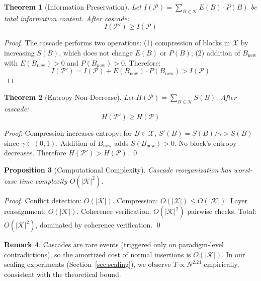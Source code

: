 \documentclass[11pt,a4paper]{article}
\newtheorem{theorem}{Theorem}[section]
\newtheorem{proposition}[theorem]{Proposition}
\theoremstyle{definition}
\newtheorem{remark}[theorem]{Remark}
\begin{document}
\begin{theorem}[Information Preservation]\label{thm:information}
Let $I(\mathcal{P}) = \sum_{B \in \mathcal{K}} E(B) \cdot P(B)$ be total information content. After cascade:
\begin{equation}
I(\mathcal{P}') \geq I(\mathcal{P})
\end{equation}
\end{theorem}
\begin{proof}
The cascade performs two operations: (1) compression of blocks in $\mathcal{X}$ by increasing $S(B)$, which does not change $E(B)$ or $P(B)$; (2) addition of $B_{\text{new}}$ with $E(B_{\text{new}}) > 0$ and $P(B_{\text{new}}) > 0$. Therefore:
\begin{equation}
I(\mathcal{P}') = I(\mathcal{P}) + E(B_{\text{new}}) \cdot P(B_{\text{new}}) > I(\mathcal{P})
\end{equation}
\end{proof}

\begin{theorem}[Entropy Non-Decrease]\label{thm:entropy}
Let $H(\mathcal{P}) = \sum_{B \in \mathcal{K}} S(B)$. After cascade:
\begin{equation}
H(\mathcal{P}') \geq H(\mathcal{P})
\end{equation}
\end{theorem}
\begin{proof}
Compression increases entropy: for $B \in \mathcal{X}$, $S'(B) = S(B)/\gamma > S(B)$ since $\gamma \in (0,1)$. Addition of $B_{\text{new}}$ adds $S(B_{\text{new}}) > 0$. No block's entropy decreases. Therefore $H(\mathcal{P}') > H(\mathcal{P})$. \qed
\end{proof}

\begin{proposition}[Computational Complexity]\label{prop:complexity}
Cascade reorganization has worst-case time complexity $O(|\mathcal{K}|^2)$.
\end{proposition}
\begin{proof}
Conflict detection: $O(|\mathcal{K}|)$. Compression: $O(|\mathcal{X}|) \leq O(|\mathcal{K}|)$. Layer reassignment: $O(|\mathcal{K}|)$. Coherence verification: $O(|\mathcal{K}|^2)$ pairwise checks. Total: $O(|\mathcal{K}|^2)$, dominated by coherence verification. \qed
\end{proof}

\begin{remark}
Cascades are rare events (triggered only on paradigm-level contradictions), so the amortized cost of normal insertions is $O(|\mathcal{K}|)$. In our scaling experiments (Section~\ref{sec:scaling}), we observe $T \propto N^{2.24}$ empirically, consistent with the theoretical bound.
\end{remark}
\end{document}

